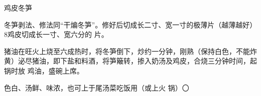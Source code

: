 \begin{recipe}{鸡皮冬笋}

\ingredients


\preparation

\step 冬笋剥法、修法同“干煸冬笋”。修好后切成长二寸、宽一寸的极薄片（越薄越好）
8鸡皮切成长一寸、宽六分的 片。

\step 猪油在旺火上烧至六成热时，将冬笋倒下，炒约一分钟，刚熟（保持白色，不能炸
黄）泌尽猪油，即下盐和料酒，将笋簸转，掺入奶汤及鸡皮，合烧三分钟时间，起锅时放
鸡油，盛碗上席。

\features

色白、汤鲜、味浓，也可上于尾汤菜吃饭用（或上火 锅）〇

\end{recipe}

